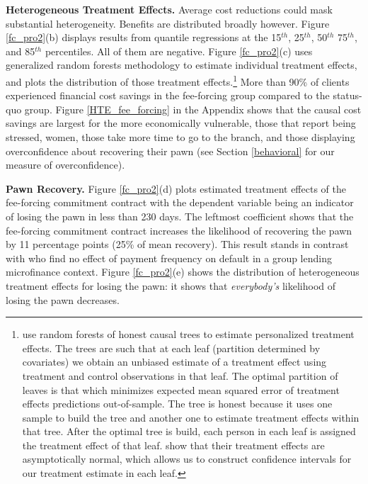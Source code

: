 \documentclass[oneside,11pt]{article}
\begin{document}
\vspace{.2in}
\noindent \textbf{Heterogeneous Treatment Effects.} Average cost reductions could mask substantial heterogeneity. Benefits are distributed broadly however. Figure \ref{fc_pro2}(b) displays results from quantile regressions at the 15$^{th}$, 25$^{th}$, 50$^{th}$ 75$^{th}$, and 85$^{th}$ percentiles. All of them are negative. Figure \ref{fc_pro2}(c) uses \cite{atheygrf} generalized random forests methodology to estimate individual treatment effects, and plots the distribution of those treatment effects.\footnote{\cite{atheygrf} use random forests of honest causal trees to estimate personalized treatment effects. The trees are such that at each leaf (partition determined by covariates) we obtain an unbiased estimate of a treatment effect using treatment and control observations in that leaf. The optimal partition of leaves is that which minimizes expected mean squared error of treatment effects predictions out-of-sample. The tree is honest because it uses one sample to build the tree and another one to estimate treatment effects within that tree. After the optimal tree is build, each person in each leaf is assigned the treatment effect of that leaf. \cite{atheygrf} show that their treatment effects are asymptotically normal, which allows us to construct confidence intervals for our treatment estimate in each leaf. } More than 90\% of clients experienced financial cost savings in the fee-forcing group compared to the status-quo group. Figure \ref{HTE_fee_forcing} in the Appendix shows that the causal cost savings are largest for the more economically vulnerable, %
those that report being stressed, women, those take more time to go to the branch, and those displaying overconfidence about recovering their pawn (see Section \ref{behavioral} for our measure of overconfidence).

\vspace{.2in}
\noindent \textbf{Pawn Recovery.} Figure \ref{fc_pro2}(d) plots estimated treatment effects of the fee-forcing commitment contract with the dependent variable being an indicator of losing the pawn in less than 230 days. The leftmost coefficient shows that the fee-forcing commitment contract increases the likelihood of recovering the pawn by 11 percentage points (25\% of mean recovery). This result stands in contrast with \cite{Pande} who find no effect of payment frequency on default in a group lending microfinance context. Figure \ref{fc_pro2}(e) shows the distribution of heterogeneous treatment effects for losing the pawn: it shows that \textit{everybody's} likelihood of losing the pawn decreases. %
\end{document}
